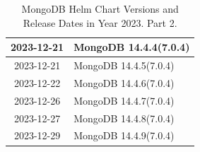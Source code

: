 \documentclass[../main.tex]{subfiles}
\begin{document}
\begin{table}[h]
\begin{minipage}{0.45\textwidth}
\begin{tabular}{|c|l|}
    2023-12-21 & MongoDB 14.4.4(7.0.4) \\ \hline  
    2023-12-21 & MongoDB 14.4.5(7.0.4) \\ \hline  
    2023-12-22 & MongoDB 14.4.6(7.0.4) \\ \hline  
    2023-12-26 & MongoDB 14.4.7(7.0.4) \\ \hline  
    2023-12-27 & MongoDB 14.4.8(7.0.4) \\ \hline  
    2023-12-29 & MongoDB 14.4.9(7.0.4) \\ \hline
\end{tabular}
\caption{MongoDB Helm Chart Versions and Release Dates in Year 2023. Part 2. \protect\footnotemark}
\label{table:mongodb_helm_versions}
\end{minipage}
\end{table}

\end{document}
